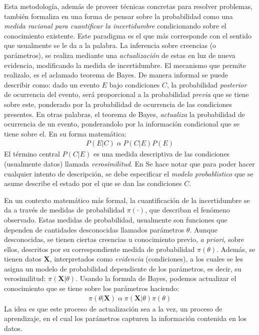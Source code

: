 \documentclass[../Main/Main.tex]{subfiles}
\begin{document}
Esta metodología, además de proveer técnicas concretas para resolver problemas, también formaliza en una forma de pensar sobre la probabilidad como una \textit{medida racional para cuantificar la incertidumbre} condicionando sobre el conocimiento existente. Este paradigma es el que más corresponde con el sentido que usualmente se le da a la palabra. La inferencia sobre creencias (o parámetros), se realiza mediante una \textit{actualización} de estas en luz de nueva evidencia, modificando la medida de incertidumbre. El mecanismo que permite realizalo, es el aclamado teorema de Bayes. De manera informal se puede describir como: dado un evento $E$ bajo condiciones $C$, la probabilidad \textit{posterior} de ocurrencia del evento, será proporcional a la probabilidad \textit{previa} que se tiene sobre este, ponderado por la probabilidad de ocurrencia de las condiciones presentes. En otras palabras, el teorema de Bayes, \textit{actualiza} la probabilidad de ocurrencia de un evento,  ponderandolo por la información condicional que se tiene sobre el. En su forma matemática: 
\begin{align}
P(E|C) \; \alpha \; P(C|E)P(E) \label{ec:BayesInformal}
\end{align}
El término central $P(C|E)$ es una medida descriptiva de las condiciones (usualmente datos) llamada \textit{verosimilitud}. En Se hace notar que para poder hacer cualquier intento de descripción, se debe especificar el \textit{modelo probablistico} que se asume describe el estado por el que se dan las condiciones $C$. 

En un contexto matemático más formal, la cuantificación de la incertidumbre se da a través de medidas de probabilidad $\pi(\cdot)$, que describan el fenómeno observado. Estas medidas de probabilidad, usualmente son funciones que dependen de cantidades desconocidas llamados parámetros $\theta$. Aunque desconocidas, se tienen ciertas creencias u conocimiento previo, \textit{a priori}, sobre ellos, descritos por su correspondiente medida de probabilidad $\pi(\theta)$. Además, se tienen datos $\mathbf{X}$, interpretados como \textit{evidencia} (condiciones), a los cuales se les asigna un modelo de probabilidad dependiente de los parámetros, es decir, su verosimilitud: $\pi(\mathbf{X}|\theta)$. Usando la formula de Bayes, podemos actualizar el conocimiento que se tiene sobre los parámetros haciendo:
\begin{align}
	\pi(\theta|\mathbf{X}) \; \alpha \; \pi(\mathbf{X}|\theta)\pi(\theta) \label{ec:BayesProporcional}
\end{align}
La idea es que este proceso de actualización sea a la vez, un proceso de aprendizaje, en el cual los parámetros capturen la información contenida en los datos.
\end{document}
